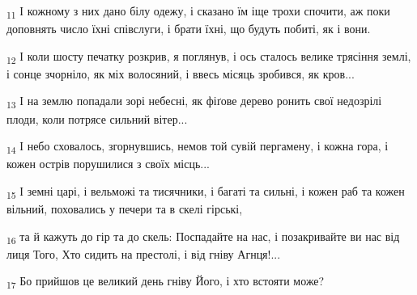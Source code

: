 \begin{tcolorbox}
\textsubscript{11} І кожному з них дано білу одежу, і сказано їм іще трохи спочити, аж поки доповнять число їхні співслуги, і брати їхні, що будуть побиті, як і вони.
\end{tcolorbox}
\begin{tcolorbox}
\textsubscript{12} І коли шосту печатку розкрив, я поглянув, і ось сталось велике трясіння землі, і сонце зчорніло, як міх волосяний, і ввесь місяць зробився, як кров...
\end{tcolorbox}
\begin{tcolorbox}
\textsubscript{13} І на землю попадали зорі небесні, як фіґове дерево ронить свої недозрілі плоди, коли потрясе сильний вітер...
\end{tcolorbox}
\begin{tcolorbox}
\textsubscript{14} І небо сховалось, згорнувшись, немов той сувій пергамену, і кожна гора, і кожен острів порушилися з своїх місць...
\end{tcolorbox}
\begin{tcolorbox}
\textsubscript{15} І земні царі, і вельможі та тисячники, і багаті та сильні, і кожен раб та кожен вільний, поховались у печери та в скелі гірські,
\end{tcolorbox}
\begin{tcolorbox}
\textsubscript{16} та й кажуть до гір та до скель: Поспадайте на нас, і позакривайте ви нас від лиця Того, Хто сидить на престолі, і від гніву Агнця!...
\end{tcolorbox}
\begin{tcolorbox}
\textsubscript{17} Бо прийшов це великий день гніву Його, і хто встояти може?
\end{tcolorbox}
